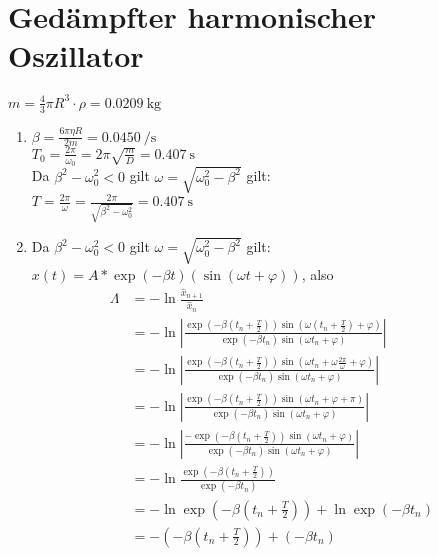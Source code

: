 \documentclass[sectionformat = exercise]{gadsescript}
\begin{document}
\section{Gedämpfter harmonischer Oszillator}
$ m = \frac{ 4 }{ 3 } \pi R^3 \cdot \rho = \qty{ 0.0209 }{ \kilogram }  $
\begin{enumerate}[label=\alph*)]
	\item $ \beta = \frac{6\pi \eta R}{ 2m } = \qty{ 0.0450 }{ \per\second }  $\\
		$ T_0 = \frac{2\pi }{ \omega_0 } = 2\pi \sqrt{\frac{ m }{ D } } = \qty{ 0.407 }{ \second }  $\\
		Da $ \beta^2 - \omega_0^2 < 0 $ gilt $ \omega = \sqrt{\omega_0^2 - \beta^2}  $ gilt:\\
		$ T = \frac{2\pi }{ \omega } = \frac{2\pi }{ \sqrt{\beta^2-\omega_0^2}  } = \qty{ 0.407 }{ \second }  $ 
	\item Da $ \beta^2 - \omega_0^2 < 0 $ gilt $ \omega = \sqrt{\omega_0^2 - \beta^2}  $ gilt:\\
		$ x(t) = A*\exp(-\beta t) \left( \sin(\omega t + \varphi) \right) $, also
		\begin{align*}
			\Lambda &= - \ln \frac{\hat{x}_{n+1}}{ \hat{x}_n } \\
			~ &= -\ln \left| \frac{ \exp \left(-\beta \left(t_n+\frac{ T }{ 2 }\right)\right) \sin \left(\omega \left(t_n + \frac{ T }{ 2 } \right) + \varphi \right) }{ \exp (-\beta t_n) \sin (\omega t_n + \varphi) } \right|\\
			~ &= -\ln \left| \frac{ \exp \left(-\beta \left(t_n+\frac{ T }{ 2 }\right)\right) \sin \left(\omega t_n + \omega\frac{ 2\pi  }{ \omega } + \varphi \right) }{ \exp (-\beta t_n) \sin (\omega t_n + \varphi) } \right|\\
			~ &= -\ln \left| \frac{ \exp \left(-\beta \left(t_n+\frac{ T }{ 2 }\right)\right) \sin (\omega t_n + \varphi + \pi) }{ \exp (-\beta t_n) \sin (\omega t_n + \varphi) } \right|\\
			~ &= -\ln \left| \frac{ -\exp \left(-\beta \left(t_n+\frac{ T }{ 2 }\right)\right) \sin (\omega t_n + \varphi) }{ \exp (-\beta t_n) \sin (\omega t_n + \varphi) } \right|\\
			~ &= -\ln \frac{ \exp \left(-\beta \left(t_n+\frac{ T }{ 2 }\right)\right) }{ \exp (-\beta t_n) }\\
			~ &= -\ln \exp \left(-\beta \left(t_n+\frac{ T }{ 2 }\right)\right) + \ln \exp (-\beta t_n)\\
			~ &= -\left(-\beta \left(t_n+\frac{ T }{ 2 }\right)\right) + (-\beta t_n)\\

\end{align*}
\end{enumerate}
\end{document}
